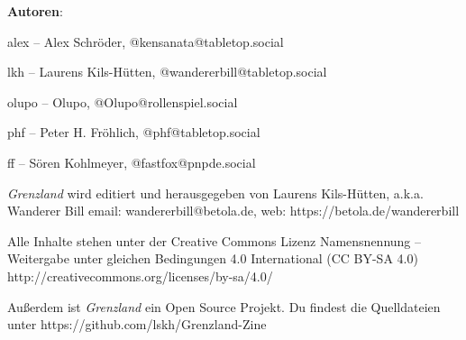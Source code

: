 \documentclass[11pt]{wbzine}
\begin{document}
\textbf{Autoren}:

alex -- Alex Schröder, @kensanata@tabletop.social

lkh -- Laurens Kils-Hütten, @wandererbill@tabletop.social

olupo -- Olupo, @Olupo@rollenspiel.social

phf -- Peter H. Fröhlich, @phf@tabletop.social

ff -- Sören Kohlmeyer, @fastfox@pnpde.social

\textit{Grenzland} wird editiert und
herausgegeben von Laurens Kils-Hütten,
a.k.a. Wanderer Bill
email: wandererbill@betola.de, web: https://betola.de/wandererbill

Alle Inhalte stehen unter der Creative Commons Lizenz
Namensnennung -- Weitergabe unter gleichen Bedingungen 4.0 International (CC BY-SA 4.0)\\
http://creativecommons.org/licenses/by-sa/4.0/

Außerdem ist \textit{Grenzland} ein Open Source Projekt. Du
findest die Quelldateien unter
https://github.com/lskh/Grenzland-Zine

\end{document}
